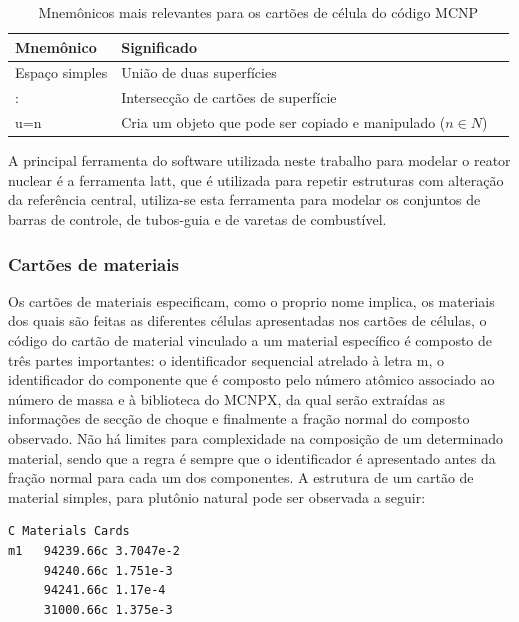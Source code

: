 \documentclass[
	12pt,				%
	openany,			%
	twoside,			%
	a4paper,			%
	english,			%
	french,				%
	spanish,			%
	brazil				%
	]{abntex2}
\begin{document}
\begin{center}
\begin{longtable}{|l|l|l|}
\caption[Mnemônicos mais relevantes para os cartões de célula do código MCNP]{Mnemônicos mais relevantes para os cartões de célula do código MCNP}

\label{CELLMNEMONICS} \\

\hline
Mnemônico & Significado\tabularnewline
\hline 
\hline 
Espaço simples & União de duas superfícies\tabularnewline
\hline 
: & Intersecção de cartões de superfície\tabularnewline
\hline 
u=n & Cria um objeto que pode ser copiado e manipulado ($n\in N$)\tabularnewline
\hline 

\end{longtable}
\end{center}
A principal ferramenta do software utilizada neste trabalho para modelar o reator nuclear é a ferramenta latt, que é utilizada para repetir estruturas com alteração da referência central, utiliza-se esta ferramenta para modelar os conjuntos de barras de controle, de tubos-guia e de varetas de combustível.

\subsubsection*{Cartões de materiais}

Os cartões de materiais especificam, como o proprio nome implica, os materiais dos quais são feitas as diferentes células apresentadas nos cartões de células, o código do cartão de material vinculado a um material específico é composto de três partes importantes: o identificador sequencial atrelado à letra m, o identificador do componente que é composto pelo número atômico associado ao número de massa e à biblioteca do MCNPX, da qual serão extraídas as informações de secção de choque
e finalmente a fração normal do composto observado. Não há limites para complexidade na composição de um determinado material, sendo que a regra é sempre que o identificador é apresentado antes da fração normal para cada um dos componentes. A estrutura de um cartão de material simples, para plutônio natural pode ser observada a seguir:

\begin{lstlisting}
C Materials Cards  
m1   94239.66c 3.7047e-2 
     94240.66c 1.751e-3  
     94241.66c 1.17e-4 
     31000.66c 1.375e-3
\end{lstlisting}
\end{document}

